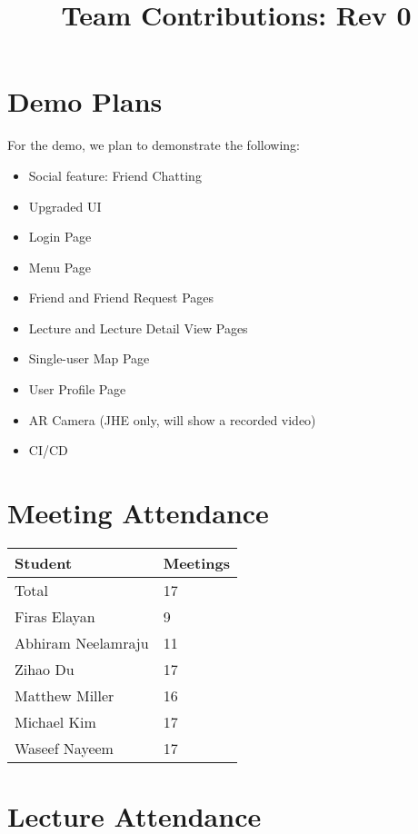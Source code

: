 \documentclass{article}
\title{Team Contributions: Rev 0\\\progname}
\author{\authname}
\date{}
\begin{document}
 
\maketitle

\section{Demo Plans}

For the demo, we plan to demonstrate the following:
\begin{itemize}
    \item Social feature: Friend Chatting
    \item Upgraded UI
    \item Login Page
    \item Menu Page
    \item Friend and Friend Request Pages
    \item Lecture and Lecture Detail View Pages
    \item Single-user Map Page
    \item User Profile Page
    \item AR Camera (JHE only, will show a recorded video)
    \item CI/CD
\end{itemize}

\section{Meeting Attendance}

\begin{table}[H]
\centering
\begin{tabular}{ll}
\toprule
\textbf{Student} & \textbf{Meetings}\\
\midrule
Total & 17\\
Firas Elayan & 9\\
Abhiram Neelamraju & 11\\
Zihao Du & 17\\
Matthew Miller & 16\\
Michael Kim & 17\\
Waseef Nayeem & 17\\
\bottomrule
\end{tabular}
\end{table}

\section{Lecture Attendance}
\end{document}
